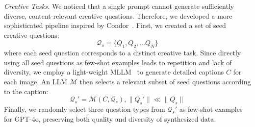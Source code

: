 \textit{Creative Tasks. }We noticed that a single prompt cannot generate sufficiently diverse, 
content-relevant creative questions. 
Therefore, we developed a more sophisticated pipeline inspired by Condor~\cite{cao2025condor}. 
First, we created a set of seed creative questions:
\begin{equation}
    \mathcal{Q}_s =\{Q_1, Q_2, ... Q_N\}
\end{equation}
where each seed question corresponds to a distinct creative task. 
Since directly using all seed questions as few-shot examples leads to repetition and lack of diversity, 
we employ a light-weight MLLM~\cite{luo2024mono} to generate detailed captions $C$ for each image. An LLM $\mathcal{M}$ then selects a relevant subset of seed questions according to the caption:
\begin{equation}
    \mathcal{Q}_s' = \mathcal{M}(C, \mathcal{Q}_s), \|Q_s'\| \ll \|Q_s\|
\end{equation}
Finally, we randomly select three question types from $\mathcal{Q}_s'$ as few-shot examples for GPT-4o, preserving both quality and diversity of synthesized data.

 
